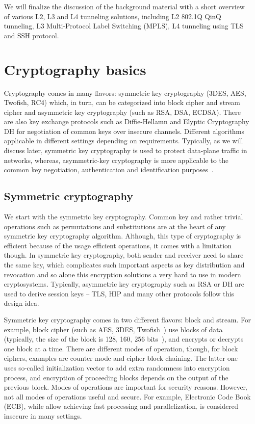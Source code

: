 We will finalize the discussion of the background material with a short overview of 
various L2, L3 and L4 tunneling solutions, including L2 802.1Q QinQ tunneling, 
L3 Multi-Protocol Label Switching (MPLS), L4 tunneling using TLS and SSH protocol.

\section{Cryptography basics}

Cryptography comes in many flavors: symmetric key cryptography 
(3DES, AES, Twofish, RC4) which, in turn, can be categorized into 
block cipher and stream cipher and asymmetric key cryptography 
(such as RSA, DSA, ECDSA). There are also key exchange protocols 
such as Diffie-Hellamn and Elyptic Cryptography DH for negotiation 
of common keys over insecure channels. Different algorithms applicable 
in different settings depending on requirements. Typically, as we will 
discuss later, symmetric key cryptography is used to protect 
data-plane traffic in networks, whereas, asymmetric-key cryptography is 
more applicable to the common key negotiation, authentication and 
identification purposes~\cite{Stinson:Cryptography}.

\subsection{Symmetric cryptography}

We start with the symmetric key cryptography. Common key and rather 
trivial operations such as permutations and substitutions are at the 
heart of any symmetric key cryptography algorithm. Although, this type 
of cryptography is efficient because of the usage efficient operations, 
it comes with a limitation though. In symmetric key cryptography, 
both sender and receiver need to share the same key, which complicates 
such important aspects as key distribution and revocation and so alone 
this encryption solutions a very hard to use in modern cryptosystems. 
Typically, asymmetric key cryptography such as RSA or DH are used to derive session 
keys – TLS, HIP and many other protocols follow this design idea.

Symmetric key cryptography comes in two different flavors: block and stream. 
For example, block cipher (such as AES, 3DES, Twofish~\cite{Stinson:Cryptography}) 
use blocks of data (typically, the size of the block is 128, 160, 256 
bits~\cite{Stinson:Cryptography}), and encrypts or 
decrypts one block at a time. There are different modes of operation, though, 
for block ciphers, examples are counter mode and cipher block chaining. The latter 
one uses so-called initialization vector to add extra randomness into encryption 
process, and encryption of proceeding blocks depends on the output of the previous 
block. Modes of operations are important for security reasons. However, not all 
modes of operations useful and secure. For example, Electronic Code Book (ECB), 
while allow achieving fast processing and parallelization, is considered insecure in 
many settings.

